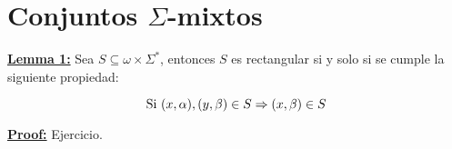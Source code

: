\section{Conjuntos $\Sigma$-mixtos}

  \textbf{\underline{Lemma 1:}} Sea $S\subseteq \omega \times \Sigma ^{\ast }$, entonces $S$ es rectangular si y
    solo si se cumple la siguiente propiedad:

    \[
      \textup{Si } (x, \alpha), (y, \beta) \in S \Rightarrow (x, \beta) \in S
    \]

  \textbf{\underline{Proof:}} Ejercicio.

  \QED
